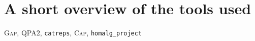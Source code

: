 
\section{A short overview of the tools used}

\textsc{Gap}, \textsc{QPA$2$}, \texttt{catreps}, \textsc{Cap}, \texttt{homalg\_project}